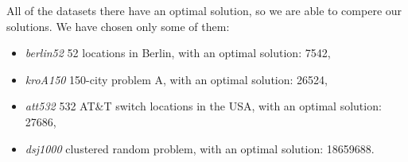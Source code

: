 	All of the datasets there have an optimal solution, so we are able to compere our solutions. We have chosen only some of them:
	\begin{itemize}
		\item \textit{berlin52} 52 locations in Berlin, with an optimal solution: 7542,
		\item \textit{kroA150} 150-city problem A, with an optimal solution: 26524,
		\item \textit{att532} 532 AT\&T switch locations in the USA, with an optimal solution: 27686,
		\item \textit{dsj1000} clustered random problem, with an optimal solution: 18659688.
	\end{itemize}